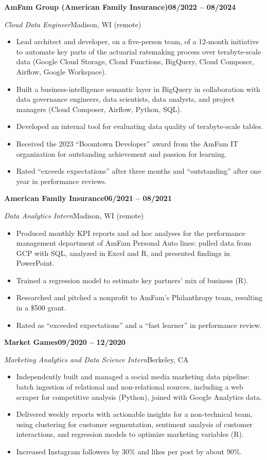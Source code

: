 \documentclass[10pt,letterpaper]{article}
\newcommand{\entry}[4]{%
  \textbf{#1}\hfill\textbf{#2}\par
  \emph{#3}\hfill #4\par
}
\begin{document}
\entry
  {AmFam Group (American Family Insurance)}
  {08/2022 -- 08/2024}
  {Cloud Data Engineer}
  {Madison, WI (remote)}
\begin{itemize}
  \item Lead architect and developer, on a five-person team, of a 12-month
    initiative to automate key parts of the actuarial ratemaking process over
    terabyte-scale data (Google Cloud Storage, Cloud Functions, BigQuery,
    Cloud Composer, Airflow, Google Workspace).
  \item Built a business-intelligence semantic layer in BigQuery in
    collaboration with data governance engineers, data scientists, data
    analysts, and project managers (Cloud Composer, Airflow, Python, SQL).
  \item Developed an internal tool for evaluating data quality of
    terabyte-scale tables.
  \item Received the 2023 ``Boomtown Developer'' award from the AmFam IT
    organization for outstanding achievement and passion for learning.
  \item Rated ``exceeds expectations'' after three months and
    ``outstanding'' after one year in performance reviews.
\end{itemize}

\vspace{0.3em}
\entry
  {American Family Insurance}
  {06/2021 -- 08/2021}
  {Data Analytics Intern}
  {Madison, WI (remote)}
\begin{itemize}
  \item Produced monthly KPI reports and ad hoc analyses for the performance
    management department of AmFam Personal Auto lines: pulled data from GCP
    with SQL, analyzed in Excel and R, and presented findings in PowerPoint.
  \item Trained a regression model to estimate key partners' mix of business
    (R).
  \item Researched and pitched a nonprofit to AmFam's Philanthropy team,
    resulting in a \$500 grant.
  \item Rated as ``exceeded expectations'' and a ``fast learner'' in
    performance review.
\end{itemize}

\vspace{0.3em}
\entry
  {Market Games}
  {09/2020 -- 12/2020}
  {Marketing Analytics and Data Science Intern}
  {Berkeley, CA}
\begin{itemize}
  \item Independently built and managed a social media marketing data
    pipeline: batch ingestion of relational and non-relational sources,
    including a web scraper for competitive analysis (Python), joined with
    Google Analytics data.
  \item Delivered weekly reports with actionable insights for a non-technical
    team, using clustering for customer segmentation, sentiment analysis of
    customer interactions, and regression models to optimize marketing
    variables (R).
  \item Increased Instagram followers by 30\% and likes per post by about
    90\%.
\end{itemize}
\end{document}
